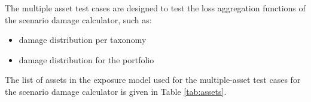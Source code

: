 The multiple asset test cases are designed to test the loss aggregation functions of the scenario damage calculator, such as:

\begin{itemize}
\item damage distribution per taxonomy
\item damage distribution for the portfolio
\end{itemize}

The list of assets in the exposure model used for the multiple-asset test cases for the scenario damage calculator is given in Table \ref{tab:assets}.




